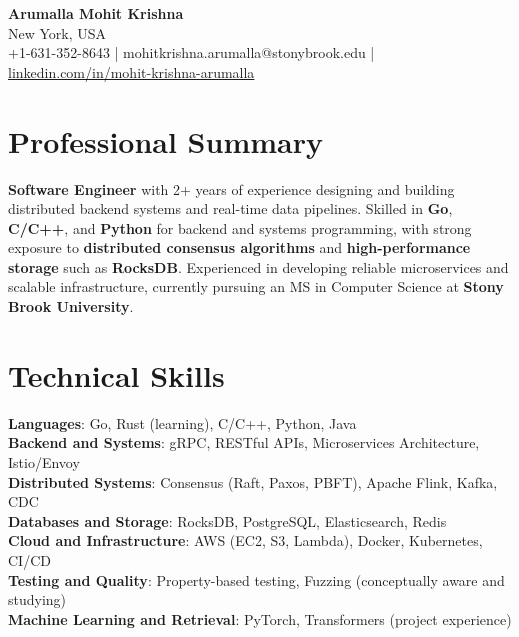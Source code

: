 \documentclass[letterpaper,11pt]{article}
\begin{document}
\begin{center}
  {\Large \textbf{Arumalla Mohit Krishna}} \\
  New York, USA \\
  +1-631-352-8643 \enspace | \enspace mohitkrishna.arumalla@stonybrook.edu \enspace | \enspace \href{https://www.linkedin.com/in/mohit-krishna-arumalla}{linkedin.com/in/mohit-krishna-arumalla}
\end{center}

\section{Professional Summary}
  \begin{itemize}[leftmargin=0.15in, label={}]
    \small{\item{
     \textbf{Software Engineer} with 2+ years of experience designing and building distributed backend systems and real-time data pipelines. Skilled in \textbf{Go}, \textbf{C/C++}, and \textbf{Python} for backend and systems programming, with strong exposure to \textbf{distributed consensus algorithms} and \textbf{high-performance storage} such as \textbf{RocksDB}. Experienced in developing reliable microservices and scalable infrastructure, currently pursuing an MS in Computer Science at \textbf{Stony Brook University}.
    }}
  \end{itemize}
\vspace{-16pt}

\section{Technical Skills}
 \begin{itemize}[leftmargin=0.15in, label={}]
    \small{\item{
     \textbf{Languages}: Go, Rust (learning), C/C++, Python, Java \\
     \textbf{Backend and Systems}: gRPC, RESTful APIs, Microservices Architecture, Istio/Envoy \\
     \textbf{Distributed Systems}: Consensus (Raft, Paxos, PBFT), Apache Flink, Kafka, CDC \\
     \textbf{Databases and Storage}: RocksDB, PostgreSQL, Elasticsearch, Redis \\
     \textbf{Cloud and Infrastructure}: AWS (EC2, S3, Lambda), Docker, Kubernetes, CI/CD \\
     \textbf{Testing and Quality}: Property-based testing, Fuzzing (conceptually aware and studying)\\
     \textbf{Machine Learning and Retrieval}: PyTorch, Transformers (project experience)
    }}
 \end{itemize}
\vspace{-16pt}
\end{document}
